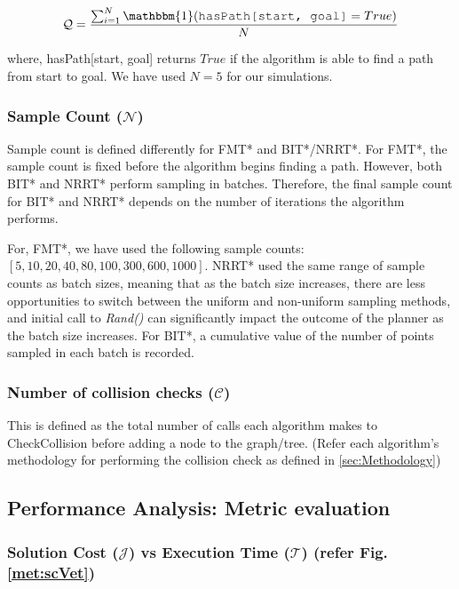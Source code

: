 \documentclass{article}
\newcommand*{\varfont}{\fontfamily{pcr}\selectfont}
\begin{document}
\begin{align}
    \mathcal{Q} = \frac{\sum_{i=1}^{N} \mathbbm{1}(\text{\varfont hasPath[start, goal]} = True)}{N}
\end{align}

where, {\varfont hasPath[start, goal]} returns $True$ if the algorithm is able to find a path from {\varfont start} to {\varfont goal}. We have used $N=5$ for our simulations.


\subsubsection{Sample Count ($\mathcal{N}$)}

Sample count is defined differently for FMT* and BIT*/NRRT*. For FMT*, the sample count is fixed before the algorithm begins finding a path. However, both BIT* and NRRT* perform sampling in batches. Therefore, the final sample count for BIT* and NRRT* depends on the number of iterations the algorithm performs.

For, FMT*, we have used the following sample counts: $[5, 10, 20, 40, 80, 100, 300, 600, 1000]$. NRRT* used the same range of sample counts as batch sizes, meaning that as the batch size increases, there are less opportunities to switch between the uniform and non-uniform sampling methods, and initial call to \emph{Rand()} can significantly impact the outcome of the planner as the batch size increases. For BIT*, a cumulative value of the number of points sampled in each batch is recorded.

\subsubsection{Number of collision checks ($\mathcal{C}$)}
This is defined as the total number of calls each algorithm makes to {\varfont CheckCollision} before adding a node to the graph/tree. (Refer each algorithm's methodology for performing the collision check as defined in \ref{sec:Methodology})

\subsection{Performance Analysis: Metric evaluation}

\subsubsection{Solution Cost ($\mathcal{J}$) vs Execution Time ($\mathcal{T}$) (refer Fig. \ref{met:scVet})}
\end{document}
